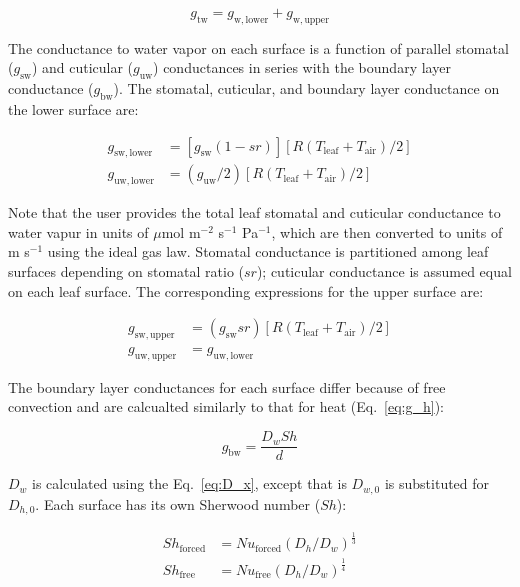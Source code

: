\documentclass[11pt, oneside]{article}
\begin{document}
\begin{equation}
  \label{eq:g_tw}
  g_\mathrm{tw} = g_\mathrm{w,lower} + g_\mathrm{w,upper}
\end{equation} 

The conductance to water vapor on each surface is a function of parallel stomatal ($g_\mathrm{sw}$) and cuticular ($g_\mathrm{uw}$) conductances in series with the boundary layer conductance ($g_\mathrm{bw}$). The stomatal, cuticular, and boundary layer conductance on the lower surface are:

\begin{align}
  g_\mathrm{sw,lower} & = [g_\mathrm{sw} (1 - \mathit{sr})] [R (T_\mathrm{leaf} + T_\mathrm{air}) / 2] \\
  g_\mathrm{uw,lower} & = (g_\mathrm{uw} / 2) [R (T_\mathrm{leaf} + T_\mathrm{air}) / 2]
\end{align}

Note that the user provides the total leaf stomatal and cuticular conductance to water vapur in units of $\mu$mol m$^{-2}$ s$^{-1}$ Pa$^{-1}$, which are then converted to units of m s$^{-1}$ using the ideal gas law. Stomatal conductance is partitioned among leaf surfaces depending on stomatal ratio ($\mathit{sr}$); cuticular conductance is assumed equal on each leaf surface. The corresponding expressions for the upper surface are:

\begin{align}
  g_\mathrm{sw,upper} & = (g_\mathrm{sw} \mathit{sr}) [R (T_\mathrm{leaf} + T_\mathrm{air}) / 2] \\
  g_\mathrm{uw,upper} & = g_\mathrm{uw,lower}
\end{align}

The boundary layer conductances for each surface differ because of free convection \citep{Foster_Smith_1986} and are calcualted similarly to that for heat (Eq.~\ref{eq:g_h}):

\begin{equation}
  g_\mathrm{bw} = \frac{D_w \mathit{Sh}}{d}
\end{equation}

$D_w$ is calculated using the Eq.~\ref{eq:D_x}, except that is $D_{w,0}$ is substituted for $D_{h,0}$. Each surface has its own Sherwood number ($\mathit{Sh}$):

\begin{align}
  \mathit{Sh}_\mathrm{forced} & = \mathit{Nu}_\mathrm{forced} (D_h / D_w) ^ \frac{1}{3} \\
  \mathit{Sh}_\mathrm{free} & = \mathit{Nu}_\mathrm{free} (D_h / D_w) ^ \frac{1}{4}
\end{align}
\end{document}
